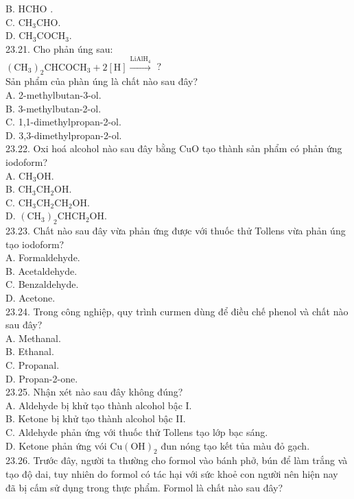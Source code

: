 \documentclass[10pt]{article}
\begin{document}
B. HCHO .\\
C. $\mathrm{CH}_{3} \mathrm{CHO}$.\\
D. $\mathrm{CH}_{3} \mathrm{COCH}_{3}$.\\
23.21. Cho phản úng sau:\\
$\left(\mathrm{CH}_{3}\right)_{2} \mathrm{CHCOCH}_{3}+2[\mathrm{H}] \xrightarrow{\mathrm{LiAlH}_{4}}$ ?\\
Sản phẩm của phàn úng là chất nào sau đây?\\
A. 2-methylbutan-3-ol.\\
B. 3-methylbutan-2-ol.\\
C. 1,1-dimethylpropan-2-ol.\\
D. 3,3-dimethylpropan-2-ol.\\
23.22. Oxi hoá alcohol nào sau đây bằng CuO tạo thành sản phẩm có phản ứng iodoform?\\
A. $\mathrm{CH}_{3} \mathrm{OH}$.\\
B. $\mathrm{CH}_{3} \mathrm{CH}_{2} \mathrm{OH}$.\\
C. $\mathrm{CH}_{3} \mathrm{CH}_{2} \mathrm{CH}_{2} \mathrm{OH}$.\\
D. $\left(\mathrm{CH}_{3}\right)_{2} \mathrm{CHCH}_{2} \mathrm{OH}$.\\
23.23. Chất nào sau đây vừa phản ứng được với thuốc thử Tollens vừa phản úng tạo iodoform?\\
A. Formaldehyde.\\
B. Acetaldehyde.\\
C. Benzaldehyde.\\
D. Acetone.\\
23.24. Trong công nghiệp, quy trình curmen dùng để điều chế phenol và chất nào sau đây?\\
A. Methanal.\\
B. Ethanal.\\
C. Propanal.\\
D. Propan-2-one.\\
23.25. Nhận xét nào sau đây không đúng?\\
A. Aldehyde bị khử tạo thành alcohol bậc I.\\
B. Ketone bị khử tạo thành alcohol bậc II.\\
C. Aldehyde phản ứng với thuốc thử Tollens tạo lớp bạc sáng.\\
D. Ketone phản ứng vói $\mathrm{Cu}(\mathrm{OH})_{2}$ đun nóng tạo kết tủa màu đỏ gạch.\\
23.26. Trước đây, người ta thường cho formol vào bánh phở, bún để làm trắng và tạo độ dai, tuy nhiên do formol có tác hại với sức khoẻ con người nên hiện nay đã bị cấm sử dụng trong thực phẩm. Formol là chất nào sau đây?\\
\end{document}
